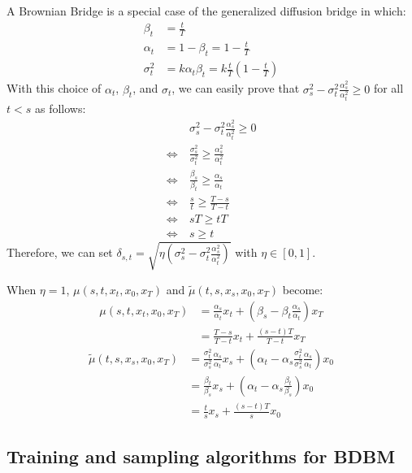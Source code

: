 A Brownian Bridge \cite{LiX0L23} is a special case of the generalized
diffusion bridge in which: 
\begin{align*}
\beta_{t} & =\frac{t}{T}\\
\alpha_{t} & =1-\beta_{t}=1-\frac{t}{T}\\
\sigma_{t}^{2} & =k\alpha_{t}\beta_{t}=k\frac{t}{T}\left(1-\frac{t}{T}\right)
\end{align*}
With this choice of $\alpha_{t}$, $\beta_{t}$, and $\sigma_{t}$,
we can easily prove that $\sigma_{s}^{2}-\sigma_{t}^{2}\frac{\alpha_{s}^{2}}{\alpha_{t}^{2}}\geq0$
for all $t<s$ as follows:
\begin{align*}
 & \sigma_{s}^{2}-\sigma_{t}^{2}\frac{\alpha_{s}^{2}}{\alpha_{t}^{2}}\geq0\\
\Leftrightarrow\  & \frac{\sigma_{s}^{2}}{\sigma_{t}^{2}}\geq\frac{\alpha_{s}^{2}}{\alpha_{t}^{2}}\\
\Leftrightarrow\  & \frac{\beta_{s}}{\beta_{t}}\geq\frac{\alpha_{s}}{\alpha_{t}}\\
\Leftrightarrow\  & \frac{s}{t}\geq\frac{T-s}{T-t}\\
\Leftrightarrow\  & sT\geq tT\\
\Leftrightarrow\  & s\geq t
\end{align*}
Therefore, we can set $\delta_{s,t}=\sqrt{\eta\left(\sigma_{s}^{2}-\sigma_{t}^{2}\frac{\alpha_{s}^{2}}{\alpha_{t}^{2}}\right)}$
with $\eta\in\left[0,1\right]$. 

When $\eta=1$, $\mu\left(s,t,x_{t},x_{0},x_{T}\right)$ and $\tilde{\mu}\left(t,s,x_{s},x_{0},x_{T}\right)$
become:
\begin{align}
\mu\left(s,t,x_{t},x_{0},x_{T}\right) & =\frac{\alpha_{s}}{\alpha_{t}}x_{t}+\left(\beta_{s}-\beta_{t}\frac{\alpha_{s}}{\alpha_{t}}\right)x_{T}\\
 & =\frac{T-s}{T-t}x_{t}+\frac{\left(s-t\right)T}{T-t}x_{T}
\end{align}
\begin{align}
\tilde{\mu}\left(t,s,x_{s},x_{0},x_{T}\right) & =\frac{\sigma_{t}^{2}}{\sigma_{s}^{2}}\frac{\alpha_{s}}{\alpha_{t}}x_{s}+\left(\alpha_{t}-\alpha_{s}\frac{\sigma_{t}^{2}}{\sigma_{s}^{2}}\frac{\alpha_{s}}{\alpha_{t}}\right)x_{0}\\
 & =\frac{\beta_{t}}{\beta_{s}}x_{s}+\left(\alpha_{t}-\alpha_{s}\frac{\beta_{t}}{\beta_{s}}\right)x_{0}\\
 & =\frac{t}{s}x_{s}+\frac{\left(s-t\right)T}{s}x_{0}
\end{align}


\subsection{Training and sampling algorithms for BDBM\label{subsec:Training-and-sampling_alg}}

